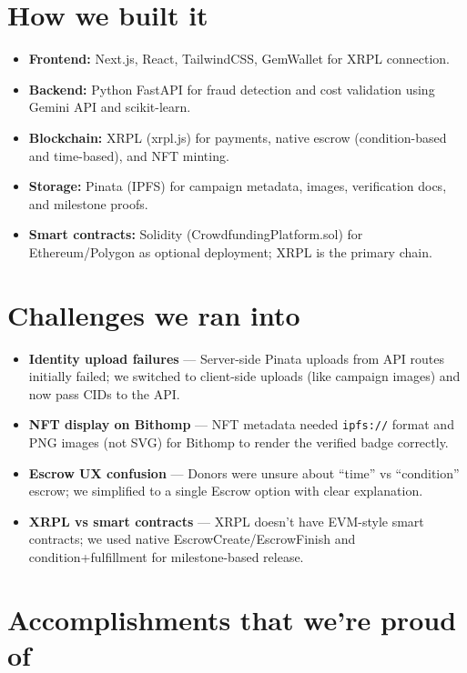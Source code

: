 \documentclass[11pt]{article}
\begin{document}
\section{How we built it}

\begin{itemize}[noitemsep]
\item \textbf{Frontend:} Next.js, React, TailwindCSS, GemWallet for XRPL connection.
\item \textbf{Backend:} Python FastAPI for fraud detection and cost validation using Gemini API and scikit-learn.
\item \textbf{Blockchain:} XRPL (xrpl.js) for payments, native escrow (condition-based and time-based), and NFT minting.
\item \textbf{Storage:} Pinata (IPFS) for campaign metadata, images, verification docs, and milestone proofs.
\item \textbf{Smart contracts:} Solidity (CrowdfundingPlatform.sol) for Ethereum/Polygon as optional deployment; XRPL is the primary chain.
\end{itemize}

\section{Challenges we ran into}

\begin{itemize}[noitemsep]
\item \textbf{Identity upload failures} — Server-side Pinata uploads from API routes initially failed; we switched to client-side uploads (like campaign images) and now pass CIDs to the API.
\item \textbf{NFT display on Bithomp} — NFT metadata needed \texttt{ipfs://} format and PNG images (not SVG) for Bithomp to render the verified badge correctly.
\item \textbf{Escrow UX confusion} — Donors were unsure about ``time'' vs ``condition'' escrow; we simplified to a single Escrow option with clear explanation.
\item \textbf{XRPL vs smart contracts} — XRPL doesn't have EVM-style smart contracts; we used native EscrowCreate/EscrowFinish and condition+fulfillment for milestone-based release.
\end{itemize}

\section{Accomplishments that we're proud of}
\end{document}
